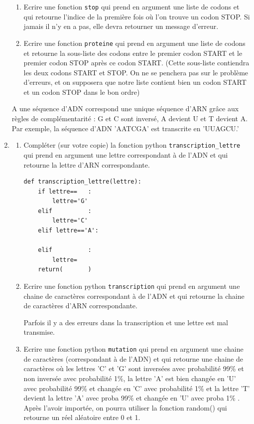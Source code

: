\begin{exercice}[Informatique]
\begin{enumerate}
\begin{enumerate}
\item Ecrire une fonction \texttt{stop} qui prend en argument une liste de codons et qui retourne  l'indice de la première fois où l'on trouve un codon STOP. Si jamais il n'y en a pas, elle devra retourner un message d'erreur. \\

\item Ecrire une fonction \texttt{proteine} qui prend en argument une liste de codons et  retourne la sous-liste des codons entre   le premier codon START et le premier codon STOP après ce codon START.  (Cette sous-liste contiendra les deux codons START et STOP. On ne  se penchera pas sur le problème d'erreurs, et on supposera que  notre liste contient bien un codon START et un codon STOP dans le bon ordre)   \\
\end{enumerate}






A une séquence d’ADN  correspond une unique séquence d’ARN grâce aux règles de complémentarité : G  et   C sont inversé, A devient U et T devient A. Par exemple, la séquence d’ADN 'AATCGA' est transcrite en 'UUAGCU.' 
\item 
\begin{enumerate}

\item Compléter (sur votre copie)  la fonction python  \texttt{transcription\_lettre} qui prend en argument une lettre correspondant à de l'ADN et qui retourne la lettre d'ARN correspondante. 
\begin{lstlisting}
def transcription_lettre(lettre):
	if lettre==   :
		lettre='G'
	elif          :
		lettre='C'
	elif lettre=='A':
	
	elif          :
		lettre=
    return(       )
\end{lstlisting}

\item Ecrire une fonction python \texttt{transcription} qui prend en argument une chaine de caractères correspondant à de l'ADN et qui retourne la chaine de caractères d'ARN correspondante. 


Parfois il y  a  des erreurs dans la transcription et une lettre est mal transmise. 

\item Ecrire une fonction python \texttt{mutation} qui prend en argument une chaine de caractères (correspondant à de l'ADN) et qui retourne une  chaine de caractères où les lettres 'C' et 'G' sont inversées avec probabilité  99\% et non inversée avec probabilité 1\%, la lettre 'A' est bien changée en 'U' avec probabilité 99\% et changée en 'C' avec probabilité 1\% et la lettre 'T' devient la  lettre 'A' avec proba 99\% et changée en 'U' avec proba 1\%  . Après l'avoir importée, on pourra utiliser la fonction random() qui retourne un réel aléatoire entre 0 et 1. 

\end{enumerate}

\end{enumerate}


\end{exercice}
